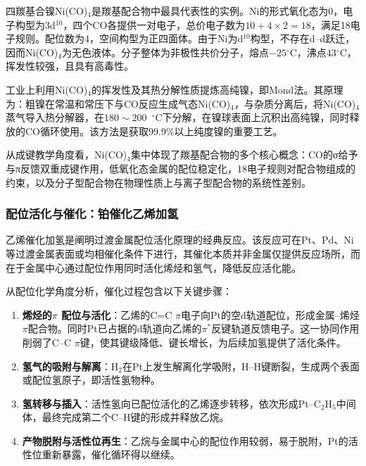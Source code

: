 \documentclass[UTF8]{ctexbook}
\begin{document}
四羰基合镍Ni(CO)$_4$是羰基配合物中最具代表性的实例。Ni的形式氧化态为0，电子构型为3d$^{10}$，四个CO各提供一对电子，总价电子数为$10 + 4 \times 2 = 18$，满足18电子规则。配位数为4，空间构型为正四面体。由于Ni为d$^{10}$构型，不存在d--d跃迁，因而Ni(CO)$_4$为无色液体。分子整体为非极性共价分子，熔点$-25$$^{\circ}\mathrm{C}$，沸点$43$$^{\circ}\mathrm{C}$，挥发性较强，且具有高毒性。

工业上利用Ni(CO)$_4$的挥发性及其热分解性质提炼高纯镍，即Mond法。其原理为：粗镍在常温和常压下与CO反应生成气态Ni(CO)$_4$，与杂质分离后，将Ni(CO)$_4$蒸气导入热分解器，在$180\sim200$~$^{\circ}\mathrm{C}$下分解，在镍球表面上沉积出高纯镍，同时释放的CO循环使用。该方法是获取99.9\%以上纯度镍的重要工艺。

从成键教学角度看，Ni(CO)$_4$集中体现了羰基配合物的多个核心概念：CO的σ给予与π反馈双重成键作用，低氧化态金属的配位稳定化，18电子规则对配合物组成的约束，以及分子型配合物在物理性质上与离子型配合物的系统性差别。

\subsubsection{配位活化与催化：铂催化乙烯加氢}

乙烯催化加氢是阐明过渡金属配位活化原理的经典反应。该反应可在Pt、Pd、Ni等过渡金属表面或均相催化条件下进行，其催化本质并非金属仅提供反应场所，而在于金属中心通过配位作用同时活化烯烃和氢气，降低反应活化能。

从配位化学角度分析，催化过程包含以下关键步骤：

\begin{enumerate}
    \item \textbf{烯烃的$\pi$ 配位与活化}：乙烯的C=C $\pi$电子向Pt的空d轨道配位，形成金属--烯烃$\pi$配合物。同时Pt已占据的d轨道向乙烯的$\pi^*$反键轨道反馈电子。这一协同作用削弱了C--C $\pi$键，使其键级降低、键长增长，为后续加氢提供了活化条件。
    
    \item \textbf{氢气的吸附与解离}：H$_2$在Pt上发生解离化学吸附，H--H键断裂，生成两个表面或配位氢原子，即活性氢物种。
    
    \item \textbf{氢转移与插入}：活性氢向已配位活化的乙烯逐步转移，依次形成Pt--C$_2$H$_5$中间体，最终完成第二个C--H键的形成并释放乙烷。
    
    \item \textbf{产物脱附与活性位再生}：乙烷与金属中心的配位作用较弱，易于脱附，Pt的活性位重新暴露，催化循环得以继续。
\end{enumerate}
\end{document}
